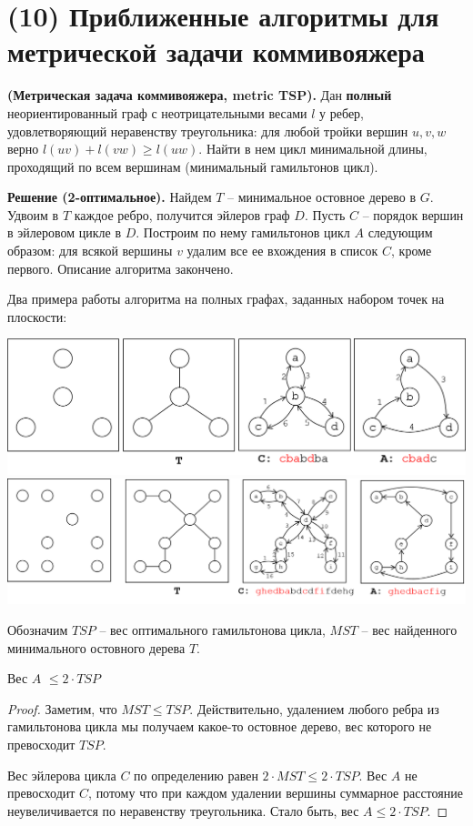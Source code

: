 \section{(10) Приближенные алгоритмы для метрической задачи коммивояжера}

\begin{problem*}\textbf{(Метрическая задача коммивояжера, metric TSP).} Дан \textbf{полный} неориентированный граф с неотрицательными весами $l$ у ребер, удовлетворяющий неравенству треугольника: для любой тройки вершин $u, v, w$ верно $l(uv) + l(vw) \geq l(uw)$. Найти в нем цикл минимальной длины, проходящий по всем вершинам (минимальный гамильтонов цикл). \end{problem*}

\textbf{Решение (2-оптимальное).} Найдем $T$ -- минимальное остовное дерево в $G$. Удвоим в $T$ каждое ребро, получится эйлеров граф $D$. Пусть $C$ -- порядок вершин в эйлеровом цикле в $D$. Построим по нему гамильтонов цикл $A$ следующим образом: для всякой вершины $v$ удалим все ее вхождения в список $C$, кроме первого. Описание алгоритма закончено.

Два примера работы алгоритма на полных графах, заданных набором точек на плоскости:

\includegraphics[width=\textwidth]{figures/ex_shorthamil.png} \\
\includegraphics[width=\textwidth]{figures/ex_longhamil.png}

Обозначим $TSP$ -- вес оптимального гамильтонова цикла, $MST$ -- вес найденного минимального остовного дерева $T$. 
\begin{theorem*} Вес $A$ $\leq 2 \cdot TSP$ \end{theorem*}
\begin{proof}
Заметим, что $MST \leq TSP$. Действительно, удалением любого ребра из гамильтонова цикла мы получаем какое-то остовное дерево, вес которого не превосходит $TSP$.

Вес эйлерова цикла $C$ по определению равен $2\cdot MST \leq 2\cdot TSP$. Вес $A$ не превосходит $C$, потому что при каждом удалении вершины суммарное расстояние неувеличивается по неравенству треугольника. Стало быть, вес $A \leq 2 \cdot TSP$.
\end{proof}

